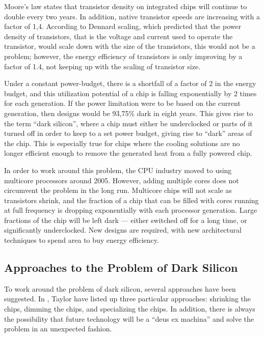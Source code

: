 Moore's law states that transistor density on integrated chips will continue to double every
two years. In addition, native transistor speeds are increasing with a factor of 1,4.
According to Dennard scaling, which predicted that the power density of transistors, that
is the voltage and current used to operate the transistor, would scale down with the
size of the transistors, this would not be a problem; however, the energy efficiency
of transistors is only improving by a factor of 1.4, not keeping up with the scaling
of transistor size.

Under a constant power-budget, there is a shortfall of a factor of 2 in the energy budget,
and this utilization potential of a chip is falling exponentially by 2 times for each generation.
If the power limitation were to be based on the current generation, then designs would be 93,75\% dark in eight years.
This gives rise to the term ``dark silicon'', where a chip must either be underclocked or parts of
it turned off in order to keep to a set power budget, giving rise to ``dark'' areas of the chip.
This is especially true for chips where the cooling solutions are no longer efficient enough to remove
the generated heat from a fully powered chip.

In order to work around this problem, the CPU industry moved to using multicore processors around 2005.
However, adding multiple cores does not circumvent the problem in the long run.
Multicore chips will not scale as transistors shrink, and the fraction of a chip that can be filled with cores running at full frequency is dropping exponentially with each processor generation. 
Large fractions of the chip will be left dark --- either switched off for a long time, or significantly underclocked.
New designs are required, with new architectural techniques to spend area to buy energy efficiency. \cite{dark-silicon}

\subsection{Approaches to the Problem of Dark Silicon}
\label{sec:taylor}

To work around the problem of dark silicon, several approaches have been suggested.
In \cite{dark-silicon}, Taylor have listed up three particular approaches: shrinking the chips, dimming the chips, and specializing the chips.
In addition, there is always the possibility that future technology will be a ``deus ex machina'' and solve the problem in
an unexpected fashion.


